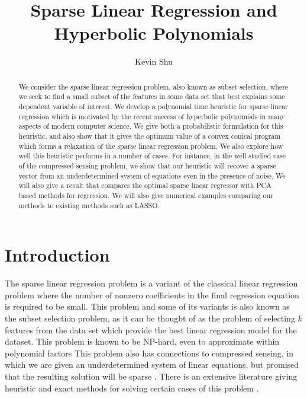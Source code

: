 \documentclass{amsart}
\theoremstyle{definition}
\numberwithin{equation}{section}
\begin{document}
\title{Sparse Linear Regression and Hyperbolic Polynomials}

\author{Kevin Shu}
\address{Department of Mathematics, Georgia Institute of Technology, 
Atlanta, GA}

\begin{abstract}
    We consider the sparse linear regression problem, also known as subset selection, where we seek to find a small subset of the features in some data set that best explains some dependent variable of interest.
    We develop a polynomial time heuristic for sparse linear regression which is motivated by the recent success of hyperbolic polynomials in many aspects of modern computer science.
    We give both a probabilistic formulation for this heuristic, and also show that it gives the optimum value of a convex conical program which forms a relaxation of the sparse linear regression problem.
    We also explore how well this heuristic performs in a number of cases.
    For instance, in the well studied case of the compressed sensing problem, we show that our heuristic will recover a sparse vector from an underdetermined system of equations even in the presence of noise.
    We will also give a result that compares the optimal sparse linear regressor with PCA based methods for regression.
    We will also give numerical examples comparing our methods to existing methods such as LASSO.
\end{abstract}
\maketitle

\section{Introduction}
The sparse linear regression problem is a variant of the classical linear regression problem where the number of nonzero coefficients in the final regression equation is required to be small.
This problem and some of its variants is also known as the subset selection problem, \cite{TODO, delpia2020subset, zhu2020polynomial} as it can be thougbt of as the problem of selecting $k$ features from the data set which provide the best linear regression model for the dataset.
This problem is known to be NP-hard, even to approximate within polynomial factors \cite{welch1982algorithmic}
This problem also has connections to compressed sensing, in which we are given an underdetermined system of linear equations, but promised that the resulting solution will be sparse  \cite{1542412}.
There is an extensive literature giving heuristic and exact methods for solving certain cases of this problem \cite{bertsimas2016best}.
\end{document}
